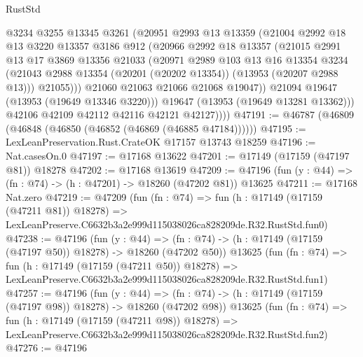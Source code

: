 \begin{lexlean}{RustStd}
\begin{coremodule}
                @3234
                @3255
                @13345
                @3261
                (@20951
                  @2993
                  @13
                  @13359
                  (@21004
                    @2992
                    @18
                    @13
                    @3220
                    @13357
                    @3186
                    @912
                    (@20966
                      @2992
                      @18
                      @13357
                      (@21015
                        @2991
                        @13
                        @17
                        @3869
                        @13356
                        @21033
                        (@20971
                          @2989
                          @103
                          @13
                          @16
                          @13354
                          @3234
                          (@21043 @2988 @13354 (@20201 (@20202 @13354)) (@13953 (@20207 @2988 @13)))
                          @21055)))
                    @21060
                    @21063
                    @21066
                    @21068
                    @19047))
                @21094
                @19647
                (@13953 (@19649 @13346 @3220)))
              @19647
              (@13953 (@19649 @13281 @13362)))
            @42106
            @42109
            @42112
            @42116
            @42121
            @42127))))
@47191 := @46787 (@46809 (@46848 (@46850 (@46852 (@46869 (@46885 @47184))))))
@47195 := LexLeanPreservation.Rust.CrateOK @17157 @13743 @18259
@47196 := Nat.casesOn.{0}
@47197 := @17168 @13622
@47201 := @17149 (@17159 (@47197 @81)) @18278
@47202 := @17168 @13619
@47209 := @47196 (fun (y : @44) => (fn : @74) -> (h : @47201) -> @18260 (@47202 @81)) @13625
@47211 := @17168 Nat.zero
@47219 := @47209
    (fun (fn : @74) =>
    fun (h : @17149 (@17159 (@47211 @81)) @18278) =>
    LexLeanPreserve.C6632b3a2e999d115038026ca828209de.R32.RustStd.fun0)
@47238 := @47196
    (fun (y : @44) =>
    (fn : @74) -> (h : @17149 (@17159 (@47197 @50)) @18278) -> @18260 (@47202 @50))
    @13625
    (fun (fn : @74) =>
    fun (h : @17149 (@17159 (@47211 @50)) @18278) =>
    LexLeanPreserve.C6632b3a2e999d115038026ca828209de.R32.RustStd.fun1)
@47257 := @47196
    (fun (y : @44) =>
    (fn : @74) -> (h : @17149 (@17159 (@47197 @98)) @18278) -> @18260 (@47202 @98))
    @13625
    (fun (fn : @74) =>
    fun (h : @17149 (@17159 (@47211 @98)) @18278) =>
    LexLeanPreserve.C6632b3a2e999d115038026ca828209de.R32.RustStd.fun2)
@47276 := @47196

\end{coremodule}
\end{lexlean}
